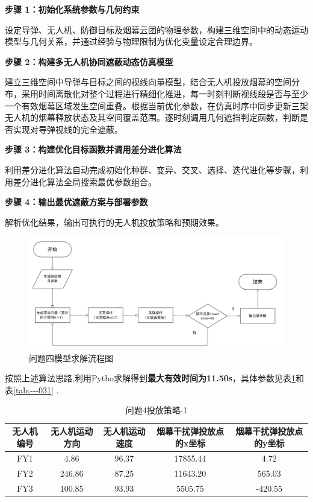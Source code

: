 \documentclass[../main.tex]{subfiles}
\begin{document}

\noindent \textbf{步骤 1：初始化系统参数与几何约束}

设定导弹、无人机、防御目标及烟幕云团的物理参数，构建三维空间中的动态运动模型与几何关系，并通过经验与物理限制为优化变量设定合理边界。

\noindent \textbf{步骤 2：构建多无人机协同遮蔽动态仿真模型} 

建立三维空间中导弹与目标之间的视线向量模型，结合无人机投放烟幕的空间分布，采用时间离散化对整个过程进行精细化推进，每一时刻判断视线段是否与至少一个有效烟幕区域发生空间重叠。根据当前优化参数，在仿真时序中同步更新三架无人机的烟幕释放状态及其空间覆盖范围。逐时刻调用几何遮挡判定函数，判断是否实现对导弹视线的完全遮蔽。

\noindent \textbf{步骤 3：构建优化目标函数并调用差分进化算法} 

利用差分进化算法自动完成初始化种群、变异、交叉、选择、迭代进化等步骤，利用差分进化算法全局搜索最优参数组合。


\noindent \textbf{步骤 4：输出最优遮蔽方案与部署参数} 

解析优化结果，输出可执行的无人机投放策略和预期效果。

\begin{figure}[H]
\centering
\includegraphics[scale=0.35]{问题4流程图.png}
\caption{问题四模型求解流程图}
\label{图...---2}
\end{figure}

按照上述算法思路,利用Pytho求解得到\textbf{最大有效时间为11.50s}，具体参数见表\ref{tab:--001}和表\ref{tab:---031} .

\begin{table}[H]
\caption{问题4投放策略-1}
\label{tab:--001} 
\centering
\begin{small}
\begin{tabular}{ccccc}
\toprule[1.5pt]
无人机编号 &无人机运动方向 & 无人机运动速度  & 烟幕干扰弹投放点的x坐标& 烟幕干扰弹投放点的y坐标 \\
\midrule[1pt]
FY1 & 4.86             &  96.37                    & 17855.44                    & 4.72     \\            
FY2 & 246.86           &  87.25                    & 11643.20                    & 565.03      \\           
FY3 & 100.85           &  93.93                    & 5505.75                    & -420.55      \\           
\bottomrule[1.5pt]
\end{tabular}
\end{small}
\end{table}
\end{document}
